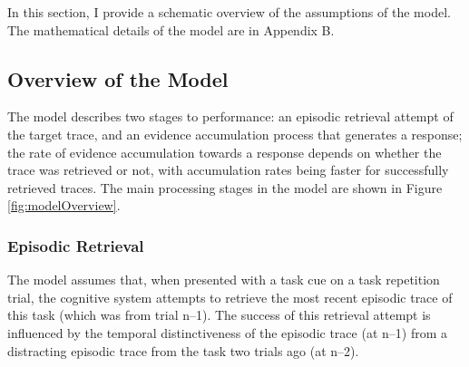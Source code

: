 \documentclass[a4paper, jou, natbib]{apa6}
\begin{document}
In this section, I provide a schematic overview of the assumptions of the model. The mathematical details of the model are in Appendix B.

\subsection{Overview of the Model}
The model describes two stages to performance: an episodic retrieval attempt of the target trace, and an evidence accumulation process that generates a response; the rate of evidence accumulation towards a response depends on whether the trace was retrieved or not, with accumulation rates being faster for successfully retrieved traces. The main processing stages in the model are shown in Figure \ref{fig:modelOverview}. 

\subsubsection{Episodic Retrieval}
 The model assumes that, when presented with a task cue on a task repetition trial, the cognitive system attempts to retrieve the most recent episodic trace of this task (which was from trial n--1). The success of this retrieval attempt is influenced by the temporal distinctiveness of the episodic trace (at n--1) from a distracting episodic trace from the task two trials ago (at n--2).  
\end{document}
